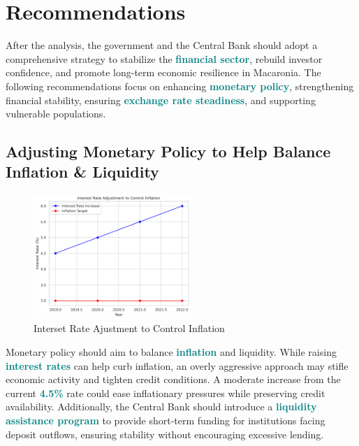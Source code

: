 \newpage 

\section*{Recommendations}

After the analysis, the government and the Central Bank should adopt a comprehensive strategy to 
stabilize the \textbf{\textcolor{teal}{financial sector}}, rebuild investor confidence, and promote 
long-term economic resilience in Macaronia. The following recommendations focus on enhancing
\textbf{\textcolor{teal}{monetary policy}}, strengthening financial stability, ensuring 
\textbf{\textcolor{teal}{exchange rate steadiness}}, and supporting vulnerable populations. 

\subsection*{Adjusting Monetary Policy to Help Balance Inflation \& Liquidity}

\begin{figure}[h]     
     \centering
     \includegraphics[width=0.53\textwidth]{adjustment.png}
     \caption{Interset Rate Ajustment to Control Inflation}
     \label{fig:graph_1}
\end{figure}

Monetary policy should aim to balance \textbf{\textcolor{teal}{inflation}} and liquidity. While raising \textbf{\textcolor{teal}{interest rates}} 
can help curb inflation, an overly aggressive approach may stifle economic activity and tighten credit conditions. A moderate increase from the current 
\textbf{\textcolor{teal}{4.5\%}} rate could ease inflationary pressures while preserving credit availability. 
Additionally, the Central Bank should introduce a \textbf{\textcolor{teal}{liquidity assistance program}} 
to provide short-term funding for institutions facing deposit outflows, ensuring stability without encouraging
excessive lending. 

